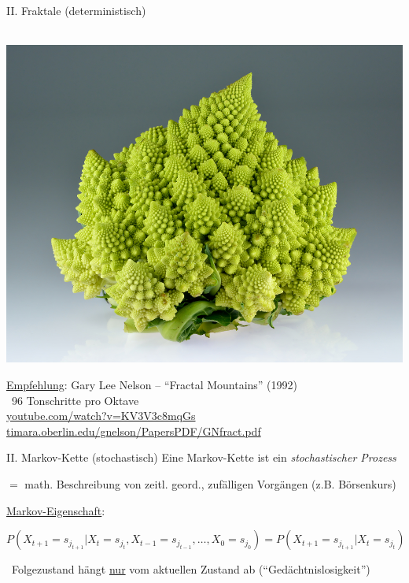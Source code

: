 \begin{frame}{II. \dimTwoTitle}{Fraktale (deterministisch)}
	\begin{center}
		~~~~~~\includegraphics[width=.46\textwidth]{img/Romanesco_broccoli.jpg}
	\end{center}
	\hfill\small \underline{Empfehlung}: Gary Lee Nelson -- \enquote{Fractal Mountains} (1992)\\
	\hfill\conclude~96 Tonschritte pro Oktave\\
	\hfill\tiny\url{youtube.com/watch?v=KV3V3c8mqGs}\\
	\hfill\url{timara.oberlin.edu/gnelson/PapersPDF/GNfract.pdf}

\end{frame}

\begin{frame}{II. \dimTwoTitle}{Markov-Kette (stochastisch)}
	Eine Markov-Kette ist ein \emph{stochastischer Prozess}
	\begin{center}
		{$=$ math. Beschreibung von zeitl. geord., zufälligen Vorgängen} (z.B. Börsenkurs)
	\end{center}

	\underline{Markov-Eigenschaft}:
	\begin{center}
		$P(X_{t+1} = s_{j_{t+1}} | X_t = s_{j_t}, X_{t-1} = s_{j_{t-1}},\dots,X_{0} = s_{j_0}) = P(X_{t+1} = s_{j_{t+1}} | X_t = s_{j_t})$
	\end{center}

	\conclude~Folgezustand hängt \underline{nur} vom aktuellen Zustand ab (\enquote{Gedächtnislosigkeit})

\end{frame}

